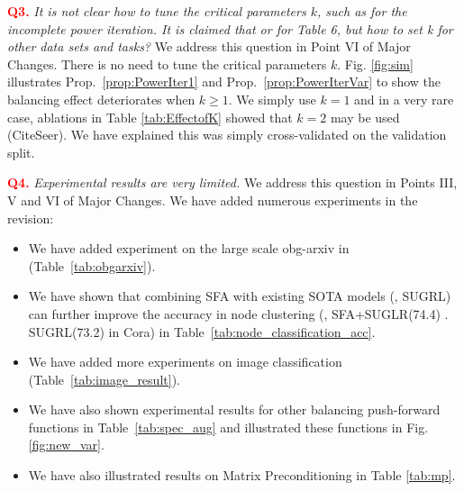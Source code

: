 \vspace{0.1cm}
\noindent\textcolor{red}{\bf Q3. } {\em It is not clear how to tune the critical parameters $k$, such as for the incomplete power iteration. It is claimed that or for Table 6, but how to set k for other data sets and tasks?}
%
We address this question in {\color{blue}Point VI} of {\color{blue}Major Changes}. There is no need to tune the critical parameters $k$. Fig. \ref{fig:sim} illustrates Prop.~\ref{prop:PowerIter1} and Prop.~\ref{prop:PowerIterVar} to show the balancing effect deteriorates when $k \geq 1$. We simply use $k=1$ and in a very rare case, ablations in Table \ref{tab:EffectofK} showed that $k=2$ may be used (CiteSeer). We have explained this was simply cross-validated on the validation split.

\vspace{0.1cm}
\noindent\textcolor{red}{\bf Q4. } {\em Experimental results are very limited.}
%
We address this question in {\color{blue}Points III, V and VI} of {\color{blue}Major Changes}. We have added numerous experiments in the revision: 
\begin{itemize}
    \item We have added experiment on the large scale obg-arxiv in (Table~\ref{tab:obgarxiv}).
    \item We have shown that combining SFA with existing SOTA models (\ie, SUGRL) can further improve the accuracy in node clustering (\eg, SFA+SUGLR(74.4) \vs. SUGRL(73.2) in Cora) in Table~\ref{tab:node_classification_acc}.
    \item We have added more experiments on image classification (Table~\ref{tab:image_result}).
    \item We have also shown experimental results for other balancing push-forward functions in Table~\ref{tab:spec_aug} and illustrated these functions in Fig. \ref{fig:new_var}.
    \item We have also illustrated results on Matrix Preconditioning in Table \ref{tab:mp}.
\end{itemize} 




